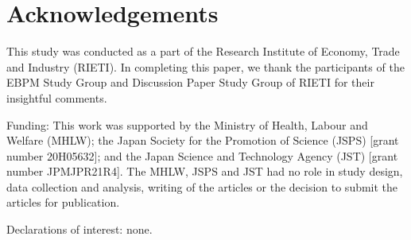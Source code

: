 \documentclass[
      12pt,
    a4paper
]{article}
\begin{document}
\hypertarget{acknowledgements}{%
\section*{Acknowledgements}\label{acknowledgements}}

This study was conducted as a part of the Research Institute of Economy, Trade and Industry (RIETI). In completing this paper, we thank the participants of the EBPM Study Group and Discussion Paper Study Group of RIETI for their insightful comments.

\noindent
Funding: This work was supported by the Ministry of Health, Labour and Welfare (MHLW); the Japan Society for the Promotion of Science (JSPS) {[}grant number 20H05632{]}; and the Japan Science and Technology Agency (JST) {[}grant number JPMJPR21R4{]}. The MHLW, JSPS and JST had no role in study design, data collection and analysis, writing of the articles or the decision to submit the articles for publication.

\noindent
Declarations of interest: none.

\clearpage


\end{document}
